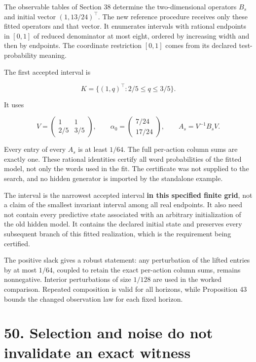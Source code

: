 \documentclass[11pt,letterpaper]{article}
\begin{document}
The observable tables of Section 38 determine the two-dimensional
operators \(B_s\) and initial vector \((1,13/24)^\top\). The new
reference procedure receives only these fitted operators and that
vector. It enumerates intervals with rational endpoints in \([0,1]\) of
reduced denominator at most eight, ordered by increasing width and then
by endpoints. The coordinate restriction \([0,1]\) comes from its
declared test-probability meaning.

The first accepted interval is

\[
\boxed{K=\{(1,q)^\top:2/5\leq q\leq3/5\}.}
\]

It uses

\[
V=\begin{pmatrix}1&1\\2/5&3/5\end{pmatrix},
\qquad \alpha_0=\begin{pmatrix}7/24\\17/24\end{pmatrix},
\qquad A_s=V^{-1}B_sV.
\]

Every entry of every \(A_s\) is at least \(1/64\). The full per-action
column sums are exactly one. These rational identities certify all word
probabilities of the fitted model, not only the words used in the fit.
The certificate was not supplied to the search, and no hidden generator
is imported by the standalone example.

The interval is the narrowest accepted interval \textbf{in this
specified finite grid}, not a claim of the smallest invariant interval
among all real endpoints. It also need not contain every predictive
state associated with an arbitrary initialization of the old hidden
model. It contains the declared initial state and preserves every
subsequent branch of this fitted realization, which is the requirement
being certified.

The positive slack gives a robust statement: any perturbation of the
lifted entries by at most \(1/64\), coupled to retain the exact
per-action column sums, remains nonnegative. Interior perturbations of
size \(1/128\) are used in the worked comparison. Repeated composition
is valid for all horizons, while Proposition 43 bounds the changed
observation law for each fixed horizon.

\section{50. Selection and noise do not invalidate an exact
witness}\label{selection-and-noise-do-not-invalidate-an-exact-witness}
\end{document}
